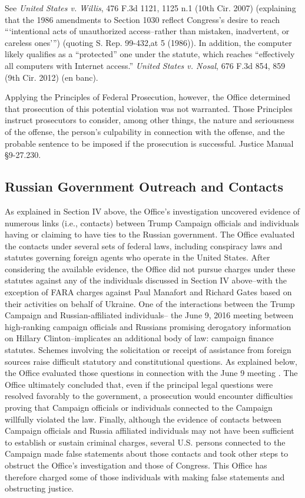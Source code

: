 See \textit{United States v. Willis}, 476 F.3d 1121, 1125 n.1 (10th Cir. 2007) (explaining that the 1986 amendments to Section 1030 reflect Congress's desire to reach ```intentional acts of unauthorized access--rather than mistaken, inadvertent, or careless ones''') (quoting S. Rep. 99-432,at 5 (1986)).
In addition, the computer  likely qualifies as a ``protected'' one under the statute, which reaches ``effectively all computers with Internet access.''
\textit{United States v. Nosal}, 676 F.3d 854, 859 (9th Cir. 2012) (en banc).

Applying the Principles of Federal Prosecution, however, the Office determined that prosecution of this potential violation was not warranted.
Those Principles instruct prosecutors to consider, among other things, the nature and seriousness of the offense, the person's culpability in connection with the offense, and the probable sentence to be imposed if the prosecution is successful.
Justice Manual \S 9-27.230. 

\subsection{Russian Government Outreach and Contacts}
As explained in Section IV above, the Office's investigation uncovered evidence of numerous links (i.e., contacts) between Trump Campaign officials and individuals having or claiming to have ties to the Russian government.
The Office evaluated the contacts under several sets of federal laws, including conspiracy laws and statutes governing foreign agents who operate in the United States.
After considering the available evidence, the Office did not pursue charges under these statutes against any of the individuals discussed in Section IV above--with the exception of FARA charges against Paul Manafort and Richard Gates based on their activities on behalf of Ukraine.
One of the interactions between the Trump Campaign and Russian-affiliated individuals-- the June 9, 2016 meeting between high-ranking campaign officials and Russians promising derogatory information on Hillary Clinton--implicates an additional body of law: campaign finance statutes.
Schemes involving the solicitation or receipt of assistance from foreign sources raise difficult statutory and constitutional questions.
As explained below, the Office evaluated those questions in connection with the June 9 meeting .
The Office ultimately concluded that, even if the principal legal questions were resolved favorably to the government, a prosecution would encounter difficulties proving that Campaign officials or individuals connected to the Campaign willfully violated the law.
Finally, although the evidence of contacts between Campaign officials and Russia affiliated individuals may not have been sufficient to establish or sustain criminal charges, several U.S. persons connected to the Campaign made false statements about those contacts and took other steps to obstruct the Office's investigation and those of Congress.
This Office has therefore charged some of those individuals with making false statements and obstructing justice.

